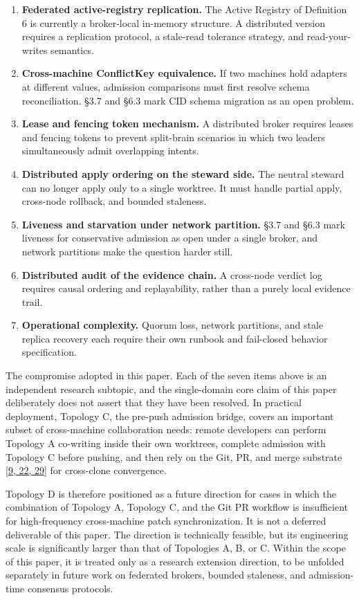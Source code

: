 \documentclass[9pt,letterpaper]{extarticle}
\begin{document}
\begin{enumerate}
\item \textbf{Federated active-registry replication.} The Active Registry of Definition 6 is currently a broker-local in-memory structure. A distributed version requires a replication protocol, a stale-read tolerance strategy, and read-your-writes semantics.
\item \textbf{Cross-machine ConflictKey equivalence.} If two machines hold adapters at different \texttt{} values, admission comparisons must first resolve schema reconciliation. §3.7 and §6.3 mark CID schema migration as an open problem.
\item \textbf{Lease and fencing token mechanism.} A distributed broker requires leases and fencing tokens to prevent split-brain scenarios in which two leaders simultaneously admit overlapping intents.
\item \textbf{Distributed apply ordering on the steward side.} The neutral steward can no longer apply only to a single worktree. It must handle partial apply, cross-node rollback, and bounded staleness.
\item \textbf{Liveness and starvation under network partition.} §3.7 and §6.3 mark liveness for conservative admission as open under a single broker, and network partitions make the question harder still.
\item \textbf{Distributed audit of the evidence chain.} A cross-node verdict log requires causal ordering and replayability, rather than a purely local evidence trail.
\item \textbf{Operational complexity.} Quorum loss, network partitions, and stale replica recovery each require their own runbook and fail-closed behavior specification.
\end{enumerate}

The compromise adopted in this paper. Each of the seven items above is an independent research subtopic, and the single-domain core claim of this paper deliberately does not assert that they have been resolved. In practical deployment, Topology C, the pre-push admission bridge, covers an important subset of cross-machine collaboration needs: remote developers can perform Topology A co-writing inside their own worktrees, complete admission with Topology C before pushing, and then rely on the Git, PR, and merge substrate \textcolor{atmLinkBlue}{\hyperlink{Item.45}{[9, 22, 29]}} for cross-clone convergence.

Topology D is therefore positioned as a future direction for cases in which the combination of Topology A, Topology C, and the Git PR workflow is insufficient for high-frequency cross-machine patch synchronization. It is not a deferred deliverable of this paper. The direction is technically feasible, but its engineering scale is significantly larger than that of Topologies A, B, or C. Within the scope of this paper, it is treated only as a research extension direction, to be unfolded separately in future work on federated brokers, bounded staleness, and admission-time consensus protocols.
\end{document}
